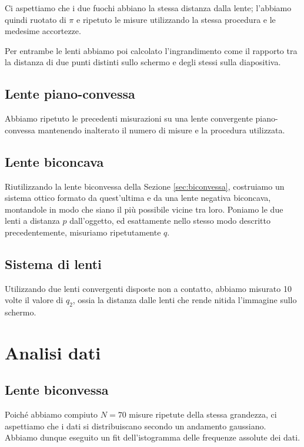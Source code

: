 \documentclass[a4paper]{article}
\begin{document}
        Ci aspettiamo che i due fuochi abbiano la stessa distanza dalla lente; l'abbiamo quindi ruotato di $\pi$ e ripetuto le misure utilizzando la stessa procedura e le medesime accortezze.

        Per entrambe le lenti abbiamo poi calcolato l'ingrandimento come il rapporto tra la distanza di due punti distinti sullo schermo e degli stessi sulla diapositiva.
        
    \subsection{Lente piano-convessa}    
    Abbiamo ripetuto le precedenti misurazioni su una lente convergente piano-convessa mantenendo inalterato il numero di misure e la procedura utilizzata.
    
    \subsection{Lente biconcava}
    Riutilizzando la lente biconvessa della Sezione \ref{sec:biconvessa}, costruiamo un sistema ottico formato da quest'ultima e da una lente negativa biconcava, montandole in modo che siano il più possibile vicine tra loro. Poniamo le due lenti a distanza $p$ dall'oggetto, ed esattamente nello stesso modo descritto precedentemente, misuriamo ripetutamente $q$.
    
    \subsection{Sistema di lenti}
    Utilizzando due lenti convergenti disposte non a contatto, abbiamo misurato 10 volte il valore di $q_2$, ossia la distanza dalle lenti che rende nitida l'immagine sullo schermo.
\section{Analisi dati}
    \subsection{Lente biconvessa}
    Poiché abbiamo compiuto $N=70$ misure ripetute della stessa grandezza, ci aspettiamo che i dati si distribuiscano secondo un andamento gaussiano. Abbiamo dunque eseguito un fit dell'istogramma delle frequenze assolute dei dati.
    \begin{figure}
    	
    \end{figure}
\end{document}

